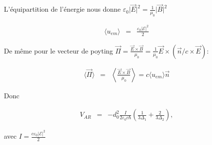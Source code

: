 L'équipartition de l'énergie nous donne $\varepsilon_0 	\vert \vec{E}\vert^2  =  \frac{1}{\mu_0} \vert\vec{B}\vert^2$

\begin{eqnarray}
	\langle u_{em} \rangle & = & \frac{\varepsilon_0 \vert \mathcal{E} \vert ^2 }{2} 
\end{eqnarray}

De même pour le vecteur de poyting $\vec{\Pi}  =   \frac{ \vec{E} \times \vec{B}} { \mu_0} = \frac{1}{\mu_0 } \vec{E} \times ( \vec{n}/c \times \vec{E} )$:

\begin{eqnarray}
	\langle \vec{\Pi} \rangle & = & \left \langle \frac{ \vec{E} \times \vec{B}} { \mu_0} \right \rangle =  c \langle u_{em} \rangle \vec{n} 	
\end{eqnarray}

Donc 

\begin{eqnarray*}
	V_{AR} &  = &  - d_0^2 \frac{   I }{2 \varepsilon_0 c  \hbar} \left( \frac{ 1}{ 3 \Delta_1} + \frac{2 }{ 3 \Delta_2}  \right ) ,		
\end{eqnarray*}

avec $I = \frac{c \varepsilon_0 \vert \mathcal{E} \vert^2}{2}$
